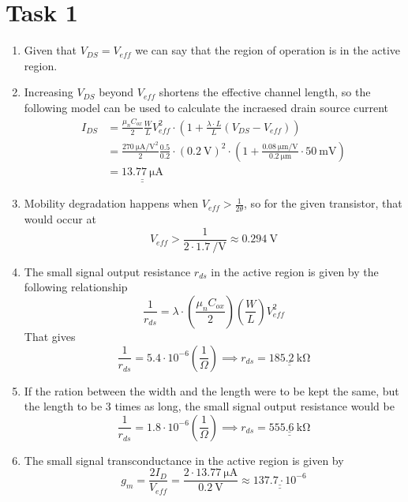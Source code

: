 \documentclass[a4paper,11pt,norsk]{article}
\begin{document}


\section*{Task 1}
\begin{enumerate}
\item Given that $V_{DS} = V_{eff}$ we can say that the region of operation is 
    in the active region.
\item Increasing $V_{DS}$ beyond $V_{eff}$ shortens the effective channel length, so the following 
    model can be used to calculate the incraesed drain source current
    \begin{align*}
        I_{DS} &= \frac{\mu_n C_{ox}}{2} \frac{W}{L} V_{eff}^2 \cdot (1 + \frac{\lambda \cdot L}{L} (V_{DS} - V_{eff})) \\
               &= \frac{\SI{270}{\micro\ampere\per\volt\squared}}{2} \frac{0.5}{0.2} \cdot (\SI{0.2}{\volt})^2 \cdot \left(1 + \frac{\SI{0.08}{\micro\meter\per\volt}}{\SI{0.2}{\micro\meter}} \cdot \SI{50}{\milli\volt}\right) \\
               &= \underline{\underline{\SI{13.77}{\micro\ampere}}}
    \end{align*}
\item Mobility degradation happens when $V_{eff} > \frac{1}{2\theta}$, so for the given transistor, that would 
    occur at 
    \[
        V_{eff} > \frac{1}{2 \cdot \SI{1.7}{\per\volt}} \approx \SI{0.294}{\volt}
    \]
\item The small signal output resistance $r_{ds}$ in the active region is given by the following relationship
    \[
        \frac{1}{r_{ds}} = \lambda \cdot \left(\frac{\mu_n C_{ox}}{2}\right)\left(\frac{W}{L}\right) V_{eff}^2
    \]
    That gives 
    \[
    \frac{1}{r_{ds}} = 5.4 \cdot 10^{-6} \left(\frac{1}{\Omega}\right) \implies r_{ds} = \underline{\underline{\SI{185.2}{\kilo\ohm}}}
    \]
\item If the ration between the width and the length were to be kept the same, but the length to be 3 times as long, the 
    small signal output resistance would be
    \[
        \frac{1}{r_{ds}} = 1.8 \cdot 10^{-6} \left(\frac{1}{\Omega}\right) \implies r_{ds} = \underline{\underline{\SI{555.6}{\kilo\ohm}}}
    \]
\item The small signal transconductance in the active region is given by
    \[
        g_m = \frac{2 I_D}{V_{eff}} = \frac{2 \cdot \SI{13.77}{\micro\ampere}}{\SI{0.2}{\volt}} \approx \underline{\underline{137.7 \cdot 10^{-6}}}
\]
\end{enumerate}
\end{document}
